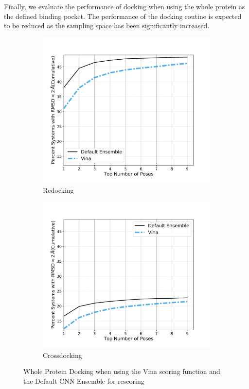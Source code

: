 \documentclass[journal=jcisd8,manuscript=article]{achemso}
\begin{document}
Finally, we evaluate the performance of docking when using the whole protein as the defined binding pocket. The performance of the docking routine is expected to be reduced as the sampling space has been significantly increased.
\begin{figure}    
        \begin{subfigure}[b]{0.48\textwidth}    
		\centering
		\includegraphics[width=\textwidth]{figures/redocking/whole_ptn_comparison_line.png}
		\caption{Redocking}
		\label{fig:WholeProteinRD}
        \end{subfigure}    
        \begin{subfigure}[b]{0.48\textwidth}    
		\centering
		\includegraphics[width=\textwidth]{figures/crossdocking/whole_ptn_comparison_line.png}
		\caption{Crossdocking}
		\label{fig:WholeProteinCD}
        \end{subfigure}    
	\caption{Whole Protein Docking when using the Vina scoring function and the Default CNN Ensemble for rescoring}
	\label{fig:WholeProtein}
\end{figure}    
\end{document}
